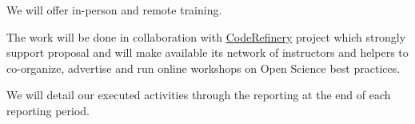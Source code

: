 \begin{task}[
  title=Training Workshops for more reproducible science,
  id=workshops,
  lead=UIO,
  PM=10,
  wphases={12-36!.416},
  partners={SRL,MP,IFR,UIO}
]
\begin{compactitem}
   \item We will offer in-person and remote training. 
  
   \item The work will be done in collaboration with
     \href{https://coderefinery.org}{CodeRefinery} project which strongly
     support \TheProject proposal and will make available its network of instructors and helpers 
     to co-organize, advertise and run online workshops on Open Science best practices. 

  \item We will detail our executed activities through the reporting at the end of
    each reporting period.
  \end{compactitem}
\end{task}
